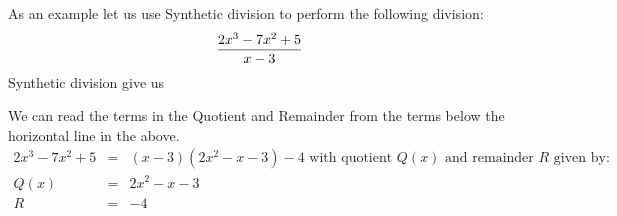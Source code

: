 As an example let us use Synthetic division to perform the following division: 
\[ {2x^3 -7x^2 + 5 \over x-3} \]
Synthetic division give us
{}

We can read the terms in the Quotient and Remainder from the terms below the horizontal line in the above. 
\begin{eqnarray*}
 2x^3 - 7x^2 + 5 &=& (x-3)(2x^2 -x -3) -4  \mbox{  with quotient } Q(x)  \mbox{ and remainder } R \mbox{ given by:}\\
 Q(x) &=& 2x^2 - x - 3 \\
 R   &=& -4
 \end{eqnarray*}
